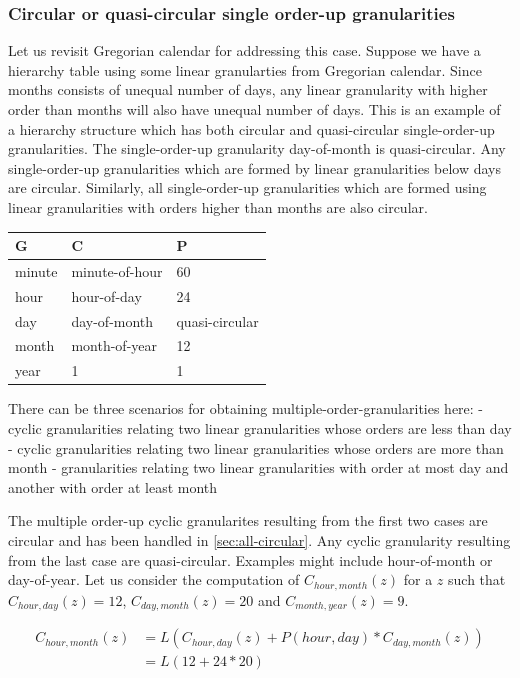 \documentclass[12pt]{article}
\begin{document}
\hypertarget{circular-or-quasi-circular-single-order-up-granularities}{%
\subsubsection{Circular or quasi-circular single order-up granularities}\label{circular-or-quasi-circular-single-order-up-granularities}}

Let us revisit Gregorian calendar for addressing this case. Suppose we have a hierarchy table using some linear granularties from Gregorian calendar. Since months consists of unequal number of days, any linear granularity with higher order than months will also have unequal number of days. This is an example of a hierarchy structure which has both circular and quasi-circular single-order-up granularities. The single-order-up granularity day-of-month is quasi-circular. Any single-order-up granularities which are formed by linear granularities below days are circular. Similarly, all single-order-up granularities which are formed using linear granularities with orders higher than months are also circular.

\begin{longtable}[]{@{}lll@{}}
\toprule
G & C & P\tabularnewline
\midrule
\endhead
minute & minute-of-hour & 60\tabularnewline
hour & hour-of-day & 24\tabularnewline
day & day-of-month & quasi-circular\tabularnewline
month & month-of-year & 12\tabularnewline
year & 1 & 1\tabularnewline
\bottomrule
\end{longtable}

There can be three scenarios for obtaining multiple-order-granularities here:
- cyclic granularities relating two linear granularities whose orders are less than day
- cyclic granularities relating two linear granularities whose orders are more than month
- granularities relating two linear granularities with order at most day and another with order at least month

The multiple order-up cyclic granularites resulting from the first two cases are circular and has been handled in \autoref{sec:all-circular}. Any cyclic granularity resulting from the last case are quasi-circular. Examples might include hour-of-month or day-of-year. Let us consider the computation of \(C_{hour, month}(z)\) for a \(z\) such that \(C_{hour, day}(z) = 12\), \(C_{day, month}(z) = 20\) and \(C_{month, year}(z) = 9\).

\begin{equation} \label{eq:hour-month}
\begin{split}
C_{hour, month}(z) & = L(C_{hour, day}(z) + P(hour, day)*C_{day, month}(z))\\
& = L(12 + 24*20)\\
\end{split}
\end{equation}
\end{document}
